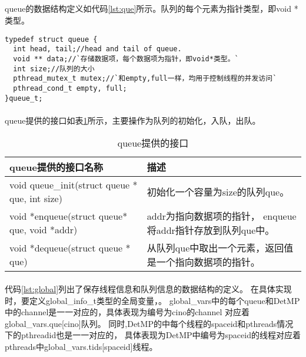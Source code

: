 \subsection{}
\paragraph{}
\label{sec:que}
queue的数据结构定义如代码\ref{lst:que}所示。队列的每个元素为指针类型，即void *类型。
\begin{lstlisting}[caption={data struct of queue},label={lst:que},float]
typedef struct queue {
  int head, tail;//head and tail of queue.
  void ** data;//`存储数据项，每个数据项为指针，即void*类型。`
  int size;//队列的大小
  pthread_mutex_t mutex;//`和empty,full一样，均用于控制线程的并发访问`
  pthread_cond_t empty, full;
}queue_t;
\end{lstlisting}

\paragraph{}
queue提供的接口如表\ref{tab:que}所示，主要操作为队列的初始化，入队，出队。
\begin{table}[!h]
\begin{footnotesize}
\caption{queue提供的接口}
  \begin{tabularx}{0.85\textwidth}{|p{}|p{}|}
  \hline
  \textbf{queue提供的接口名称} & \textbf{描述}\\
  \hline
  void queue\_init(struct queue * que, int size)& 初始化一个容量为size的队列que。\\
  \hline
  void *enqueue(struct queue* que, void *addr) & addr为指向数据项的指针， enqueue将addr指针存放到队列que中。\\
  \hline
  void *dequeue(struct queue * que)  &从队列que中取出一个元素，返回值是一个指向数据项的指针。\\
  \hline
 \end{tabularx}
\label{tab:que}
\end{footnotesize}
\end{table}

\paragraph{}
\label{sec:global}
代码\ref{lst:global}列出了保存线程信息和队列信息的数据结构的定义。
在具体实现时，要定义global\_info\_t类型的全局变量，。
global\_vars中的每个queue和DetMP中的channel是一一对应的，具体表现为编号为cino的channel
对应着global\_vars.que[cino]队列。
同时,DetMP的中每个线程的spaceid和pthreads情况下的pthreadid也是一一对应的，
具体表现为DetMP中编号为spaceid的线程对应着pthreads中global\_vars.tids[spaceid]线程。

